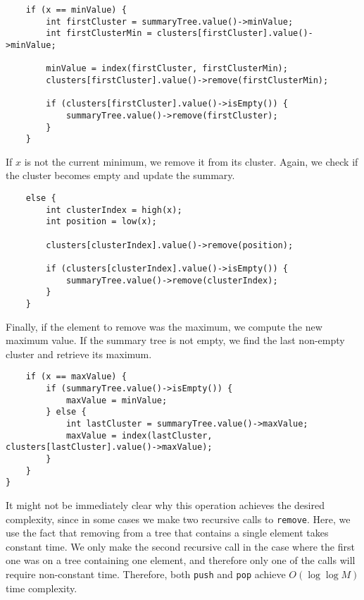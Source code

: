 \begin{verbatim}
    if (x == minValue) {
        int firstCluster = summaryTree.value()->minValue;
        int firstClusterMin = clusters[firstCluster].value()->minValue;

        minValue = index(firstCluster, firstClusterMin);
        clusters[firstCluster].value()->remove(firstClusterMin);

        if (clusters[firstCluster].value()->isEmpty()) {
            summaryTree.value()->remove(firstCluster);
        }
    }
\end{verbatim}

If \( x \) is not the current minimum, we remove it from its cluster. Again, we check if the cluster becomes empty and update the summary.

\begin{verbatim}
    else {
        int clusterIndex = high(x);
        int position = low(x);

        clusters[clusterIndex].value()->remove(position);

        if (clusters[clusterIndex].value()->isEmpty()) {
            summaryTree.value()->remove(clusterIndex);
        }
    }
\end{verbatim}

Finally, if the element to remove was the maximum, we compute the new maximum value. If the summary tree is not empty, we find the last non-empty cluster and retrieve its maximum.

\begin{verbatim}
    if (x == maxValue) {
        if (summaryTree.value()->isEmpty()) {
            maxValue = minValue;
        } else {
            int lastCluster = summaryTree.value()->maxValue;
            maxValue = index(lastCluster, clusters[lastCluster].value()->maxValue);
        }
    }
}
\end{verbatim}

It might not be immediately clear why this operation achieves the desired complexity, since in some cases we make two recursive calls to \texttt{remove}. Here, we use the fact that removing from a tree that contains a single element takes constant time. We only make the second recursive call in the case where the first one was on a tree containing one element, and therefore only one of the calls will require non-constant time. Therefore, both \texttt{push} and \texttt{pop} achieve \( O(\log \log M) \) time complexity.
